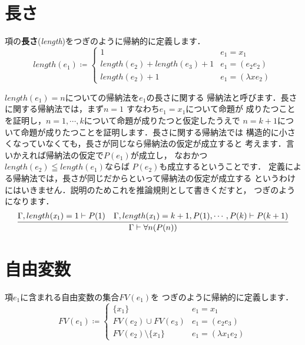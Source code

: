 \documentclass{ltjsbook}%
\newcommand\term[2]{\textbf{#1}{(\textit{#2})}}%
\begin{document}
\section{長さ}%
\label{sect:length}%
項の\term{長さ}{length}をつぎのように帰納的に定義します．%
\begin{equation}%
  length(\mathit{e}_1) \coloneqq \begin{cases}%
    1 & \mathit{e}_1 = \mathit{x}_1\\%
    length(\mathit{e}_2) + length(\mathit{e}_3) + 1%
    & \mathit{e}_1 = (\mathit{e}_2\mathit{e}_2)\\%
    length(\mathit{e}_2) + 1 & \mathit{e}_1 = (\lambda\mathit{x}\mathit{e}_2)%
  \end{cases}%
\end{equation}%
\par$length(\mathit{e}_1)=n$についての帰納法を$\mathit{e}_1$の長さに関する%
帰納法と呼びます．長さに関する帰納法では，まず$n = 1$%
すなわち$\mathit{e}_1 = \mathit{x}_1$について命題が%
成りたつことを証明し，$n = 1,\cdots,k$について命題が成りたつと仮定したうえで%
$n = k + 1$について命題が成りたつことを証明します．長さに関する帰納法では%
構造的に小さくなっていなくても，長さが同じなら帰納法の仮定が成立すると%
考えます．言いかえれば帰納法の仮定で$P(\mathit{e}_1)$が成立し，%
なおかつ$length(\mathit{e}_2)\leqq length(\mathit{e}_1)$ならば%
$P(\mathit{e}_2)$も成立するということです．%
定義による帰納法では，長さが同じだからといって帰納法の仮定が成立する%
というわけにはいきません．説明のためこれを推論規則として書きくだすと，%
つぎのようになります．%
\begin{equation}%
  \infer{%
    \Gamma\vdash\forall n(P(n))%
  }{%
    \Gamma,length(\mathit{x}_1)=1\vdash P(1)%
  &%
    \Gamma,length(\mathit{x}_1)=k+1,%
    P(1),\cdots,P(k)\vdash P(k+1)%
  }%
\end{equation}%
\section{自由変数}%
\label{untyped:fv}%
項$\mathit{e}_1$に含まれる自由変数の集合$FV(\mathit{e}_1)$を%
つぎのように帰納的に定義します．%
\begin{equation}%
  FV(\mathit{e}_1) \coloneqq \begin{cases}%
    \{\mathit{x}_1\} & \mathit{e}_1 = \mathit{x}_1\\%
    FV(\mathit{e}_2)\cup FV(\mathit{e}_3)%
    & \mathit{e}_1 = (\mathit{e}_2\mathit{e}_3)\\%
    FV(\mathit{e}_2)\setminus\{\mathit{x}_1\}%
    & \mathit{e}_1 = (\lambda\mathit{x}_1\mathit{e}_2)%
  \end{cases}%
\end{equation}%
\end{document}
